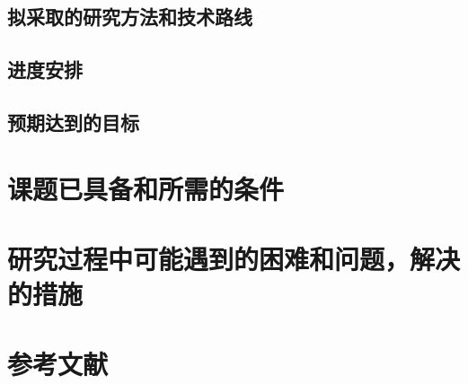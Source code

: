 \subsection{拟采取的研究方法和技术路线}
\subsection{进度安排}
\subsection{预期达到的目标}
\section{课题已具备和所需的条件}
\section{研究过程中可能遇到的困难和问题，解决的措施}
\section{参考文献}



